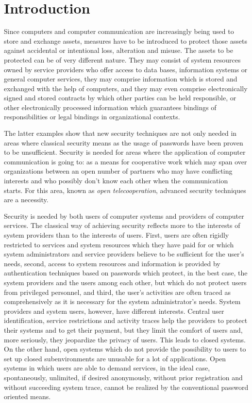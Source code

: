 \section{Introduction}
\thispagestyle{myheadings}
\label{introduction}
Since computers and computer communication are increasingly being used to store and
exchange assets, measures have to be introduced to protect those assets
against accidental or intentional loss, alteration and misuse. The assets to be protected
can be of very different nature. They may consist of system resources owned by service providers
who offer access to data bases, information systems or general computer services, they may comprise
information which is stored and exchanged with the help of computers, and they may even comprise 
electronically signed and stored contracts by which other parties can be held responsible, or
other electronically processed information which guarantees bindings of responsibilities
or legal bindings in organizational contexts. 

The latter examples show that new security techniques are not only needed in areas
where classical security means as the usage of passwords have been proven to be 
unsufficient. Security is needed for areas where the application of computer
communication is going to: as a means for cooperative work which may
span over organizations between an open number of partners who may have 
conflicting interests and who possibly don't know each other when the communication
starts. For this area, known as {\em open telecooperation}, 
advanced security techniques are a necessity. 

Security is needed by both users of computer systems and providers of computer
services. The classical way of achieving security reflects more to the interests
of system providers than to the interests of users.
First, users are often rigidly restricted to services and system resources 
which they have paid for or which 
system administrators and service providers believe to be sufficient for the user's needs,
second, access to system resources and information is provided by authentication
techniques based on passwords which protect, in the best case, the system
providers and the users among each other, but which do not protect users from
privileged personnel, 
and third, the user's activities are often traced as comprehensively as it is necessary
for the system administrator's needs. System providers and system users, however,
have different interests. Central user identification, service restrictions and
activity traces help the providers to protect their systems and to get their payment,
but they limit the comfort of users and, more seriously, they jeopardize the privacy
of users. This leads to closed systems. On the other hand, open systems which do
not provide the possibility to users to set up closed subenvironments are unusable
for a lot of applications.
Open systems in which users are able to demand services, 
in the ideal case, spontaneously, unlimited, if desired anonymously, without
prior registration and without succeeding system trace, cannot be realized by 
the conventional password oriented means.

